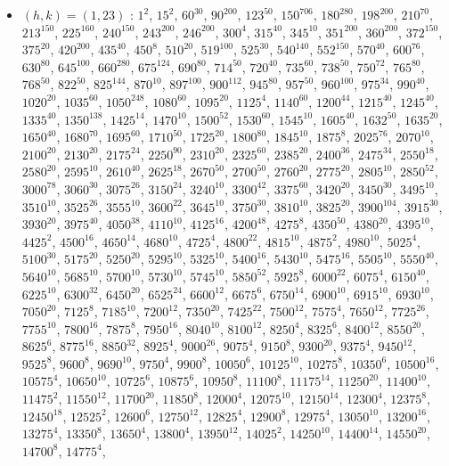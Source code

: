 \begin{itemize}
\item $(h,k)=(1,23)$ : $1^{2}$, $15^{2}$, $60^{30}$, $90^{200}$, $123^{50}$, $150^{706}$, $180^{280}$, $198^{200}$, $210^{70}$, $213^{150}$, $225^{160}$, $240^{150}$, $243^{200}$, $246^{200}$, $300^{4}$, $315^{40}$, $345^{10}$, $351^{200}$, $360^{200}$, $372^{150}$, $375^{20}$, $420^{200}$, $435^{40}$, $450^{8}$, $510^{20}$, $519^{100}$, $525^{30}$, $540^{140}$, $552^{150}$, $570^{40}$, $600^{76}$, $630^{80}$, $645^{100}$, $660^{280}$, $675^{124}$, $690^{80}$, $714^{50}$, $720^{40}$, $735^{60}$, $738^{50}$, $750^{72}$, $765^{80}$, $768^{50}$, $822^{50}$, $825^{144}$, $870^{10}$, $897^{100}$, $900^{112}$, $945^{80}$, $957^{50}$, $960^{100}$, $975^{34}$, $990^{40}$, $1020^{20}$, $1035^{60}$, $1050^{248}$, $1080^{60}$, $1095^{20}$, $1125^{4}$, $1140^{60}$, $1200^{44}$, $1215^{40}$, $1245^{40}$, $1335^{40}$, $1350^{138}$, $1425^{14}$, $1470^{10}$, $1500^{52}$, $1530^{60}$, $1545^{10}$, $1605^{40}$, $1632^{50}$, $1635^{20}$, $1650^{40}$, $1680^{70}$, $1695^{60}$, $1710^{50}$, $1725^{20}$, $1800^{80}$, $1845^{10}$, $1875^{8}$, $2025^{76}$, $2070^{10}$, $2100^{20}$, $2130^{20}$, $2175^{24}$, $2250^{90}$, $2310^{20}$, $2325^{60}$, $2385^{20}$, $2400^{36}$, $2475^{34}$, $2550^{18}$, $2580^{20}$, $2595^{10}$, $2610^{40}$, $2625^{18}$, $2670^{50}$, $2700^{50}$, $2760^{20}$, $2775^{20}$, $2805^{10}$, $2850^{52}$, $3000^{78}$, $3060^{30}$, $3075^{26}$, $3150^{24}$, $3240^{10}$, $3300^{42}$, $3375^{60}$, $3420^{20}$, $3450^{30}$, $3495^{10}$, $3510^{10}$, $3525^{26}$, $3555^{10}$, $3600^{22}$, $3645^{10}$, $3750^{30}$, $3810^{10}$, $3825^{20}$, $3900^{104}$, $3915^{30}$, $3930^{20}$, $3975^{40}$, $4050^{38}$, $4110^{10}$, $4125^{16}$, $4200^{48}$, $4275^{8}$, $4350^{50}$, $4380^{20}$, $4395^{10}$, $4425^{2}$, $4500^{16}$, $4650^{14}$, $4680^{10}$, $4725^{4}$, $4800^{22}$, $4815^{10}$, $4875^{2}$, $4980^{10}$, $5025^{4}$, $5100^{30}$, $5175^{20}$, $5250^{20}$, $5295^{10}$, $5325^{10}$, $5400^{16}$, $5430^{10}$, $5475^{16}$, $5505^{10}$, $5550^{40}$, $5640^{10}$, $5685^{10}$, $5700^{10}$, $5730^{10}$, $5745^{10}$, $5850^{52}$, $5925^{8}$, $6000^{22}$, $6075^{4}$, $6150^{40}$, $6225^{10}$, $6300^{32}$, $6450^{20}$, $6525^{24}$, $6600^{12}$, $6675^{6}$, $6750^{14}$, $6900^{10}$, $6915^{10}$, $6930^{10}$, $7050^{20}$, $7125^{8}$, $7185^{10}$, $7200^{12}$, $7350^{20}$, $7425^{22}$, $7500^{12}$, $7575^{4}$, $7650^{12}$, $7725^{26}$, $7755^{10}$, $7800^{16}$, $7875^{8}$, $7950^{16}$, $8040^{10}$, $8100^{12}$, $8250^{4}$, $8325^{6}$, $8400^{12}$, $8550^{20}$, $8625^{6}$, $8775^{16}$, $8850^{32}$, $8925^{4}$, $9000^{26}$, $9075^{4}$, $9150^{8}$, $9300^{20}$, $9375^{4}$, $9450^{12}$, $9525^{8}$, $9600^{8}$, $9690^{10}$, $9750^{4}$, $9900^{8}$, $10050^{6}$, $10125^{10}$, $10275^{8}$, $10350^{6}$, $10500^{16}$, $10575^{4}$, $10650^{10}$, $10725^{6}$, $10875^{6}$, $10950^{8}$, $11100^{8}$, $11175^{14}$, $11250^{20}$, $11400^{10}$, $11475^{2}$, $11550^{12}$, $11700^{20}$, $11850^{8}$, $12000^{4}$, $12075^{10}$, $12150^{14}$, $12300^{4}$, $12375^{8}$, $12450^{18}$, $12525^{2}$, $12600^{6}$, $12750^{12}$, $12825^{4}$, $12900^{8}$, $12975^{4}$, $13050^{10}$, $13200^{16}$, $13275^{4}$, $13350^{8}$, $13650^{4}$, $13800^{4}$, $13950^{12}$, $14025^{2}$, $14250^{10}$, $14400^{14}$, $14550^{20}$, $14700^{8}$, $14775^{4}$, 
\end{itemize}
